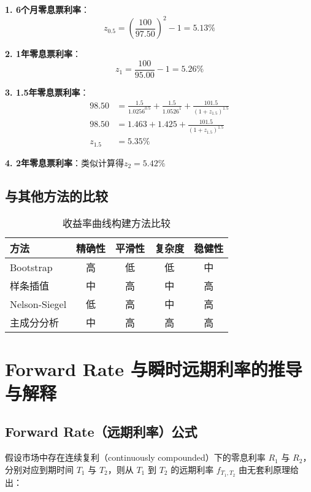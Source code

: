 \textbf{1. 6个月零息票利率}：
\begin{equation}
z_{0.5} = \left(\frac{100}{97.50}\right)^2 - 1 = 5.13\%
\end{equation}

\textbf{2. 1年零息票利率}：
\begin{equation}
z_1 = \frac{100}{95.00} - 1 = 5.26\%
\end{equation}

\textbf{3. 1.5年零息票利率}：
\begin{align}
98.50 &= \frac{1.5}{1.0256^{0.5}} + \frac{1.5}{1.0526^{1}} + \frac{101.5}{(1+z_{1.5})^{1.5}} \\
98.50 &= 1.463 + 1.425 + \frac{101.5}{(1+z_{1.5})^{1.5}} \\
z_{1.5} &= 5.35\%
\end{align}

\textbf{4. 2年零息票利率}：类似计算得$z_2 = 5.42\%$

\subsection{与其他方法的比较}

\begin{table}[H]
\centering
\caption{收益率曲线构建方法比较}
\begin{tabular}{|l|c|c|c|c|}
\hline
\textbf{方法} & \textbf{精确性} & \textbf{平滑性} & \textbf{复杂度} & \textbf{稳健性} \\
\hline
Bootstrap & 高 & 低 & 低 & 中 \\
样条插值 & 中 & 高 & 中 & 高 \\
Nelson-Siegel & 低 & 高 & 中 & 高 \\
主成分分析 & 中 & 高 & 高 & 高 \\
\hline
\end{tabular}
\end{table}


\section{Forward Rate 与瞬时远期利率的推导与解释}

\subsection{Forward Rate（远期利率）公式}

假设市场中存在连续复利（continuously compounded）下的零息利率 $R_1$ 与 $R_2$，分别对应到期时间 $T_1$ 与 $T_2$，则从 $T_1$ 到 $T_2$ 的远期利率 $f_{T_1,T_2}$ 由无套利原理给出：

